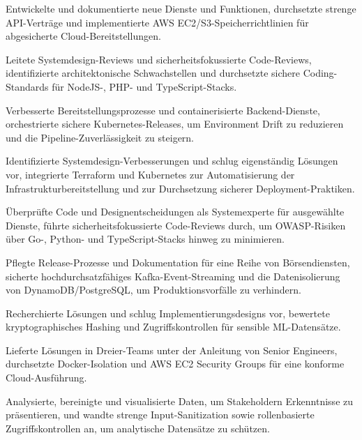 \documentclass[11pt,a4paper]{resume}
\begin{document}
\bullets
  \item Entwickelte und dokumentierte neue Dienste und Funktionen, durchsetzte strenge API-Verträge und implementierte AWS EC2/S3-Speicherrichtlinien für abgesicherte Cloud-Bereitstellungen.
  \item Leitete Systemdesign-Reviews und sicherheitsfokussierte Code-Reviews, identifizierte architektonische Schwachstellen und durchsetzte sichere Coding-Standards für NodeJS-, PHP- und TypeScript-Stacks.
  \item Verbesserte Bereitstellungsprozesse und containerisierte Backend-Dienste, orchestrierte sichere Kubernetes-Releases, um Environment Drift zu reduzieren und die Pipeline-Zuverlässigkeit zu steigern.
\bulletsend
\vspace{3pt}
\bullets
  \item Identifizierte Systemdesign-Verbesserungen und schlug eigenständig Lösungen vor, integrierte Terraform und Kubernetes zur Automatisierung der Infrastrukturbereitstellung und zur Durchsetzung sicherer Deployment-Praktiken.
  \item Überprüfte Code und Designentscheidungen als Systemexperte für ausgewählte Dienste, führte sicherheitsfokussierte Code-Reviews durch, um OWASP-Risiken über Go-, Python- und TypeScript-Stacks hinweg zu minimieren.
  \item Pflegte Release-Prozesse und Dokumentation für eine Reihe von Börsendiensten, sicherte hochdurchsatzfähiges Kafka-Event-Streaming und die Datenisolierung von DynamoDB/PostgreSQL, um Produktionsvorfälle zu verhindern.
\bulletsend
\vspace{3pt}
\bullets
  \item Recherchierte Lösungen und schlug Implementierungsdesigns vor, bewertete kryptographisches Hashing und Zugriffskontrollen für sensible ML-Datensätze.
  \item Lieferte Lösungen in Dreier-Teams unter der Anleitung von Senior Engineers, durchsetzte Docker-Isolation und AWS EC2 Security Groups für eine konforme Cloud-Ausführung.
  \item Analysierte, bereinigte und visualisierte Daten, um Stakeholdern Erkenntnisse zu präsentieren, und wandte strenge Input-Sanitization sowie rollenbasierte Zugriffskontrollen an, um analytische Datensätze zu schützen.
\bulletsend
\vspace{3pt}
\end{document}

